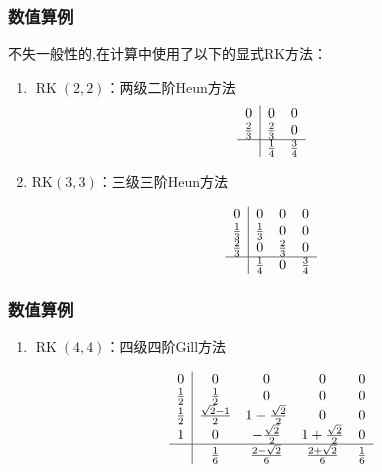 \documentclass[aspectratio=169]{beamer}
\numberwithin{theorem}{section} %
\numberwithin{equation}{section}%
\numberwithin{figure}{section}%
\numberwithin{table}{section}%
\begin{document}
\begin{frame}\frametitle{数值算例}
	不失一般性的,在计算中使用了以下的显式RK方法\cite{shuEfficientImplementationEssentially1988}：
	\begin{enumerate}
	\item $\operatorname{RK}(2,2)$：两级二阶Heun方法%
	\begin{equation}
	\begin{array}{c|cc}
	0 & 0 & 0 \\
	\frac{2}{3} & \frac{2}{3} & 0 \\
	\hline & \frac{1}{4} & \frac{3}{4}
	\end{array}
	\end{equation}
		
	\item $\mathrm{RK}(3,3)$：三级三阶Heun方法%
		
	\begin{equation}
	\begin{array}{c|ccc}
	0 & 0 & 0 & 0 \\
	\frac{1}{3} & \frac{1}{3} & 0 & 0 \\
	\frac{2}{3} & 0 & \frac{2}{3} & 0 \\
	\hline & \frac{1}{4} & 0 & \frac{3}{4}
	\end{array}
	\end{equation}
	\end{enumerate}
\end{frame}
\begin{frame}\frametitle{数值算例}
	
	\begin{enumerate}[3]
		\item $\operatorname{RK}(4,4)$：四级四阶Gill方法%
			
	\begin{equation}
	\begin{array}{c|cccc}
	0 & 0 & 0 & 0 & 0 \\
	\frac{1}{2} & \frac{1}{2} & 0 & 0 & 0 \\
	\frac{1}{2} & \frac{\sqrt{2}-1}{2} & 1-\frac{\sqrt{2}}{2} & 0 & 0 \\
	1 & 0 & -\frac{\sqrt{2}}{2} & 1+\frac{\sqrt{2}}{2} & 0 \\
	\hline & \frac{1}{6} & \frac{2-\sqrt{2}}{6} & \frac{2+\sqrt{2}}{6} & \frac{1}{6}
	\end{array}
	\end{equation}
	\end{enumerate}
\end{frame}
\end{document}
